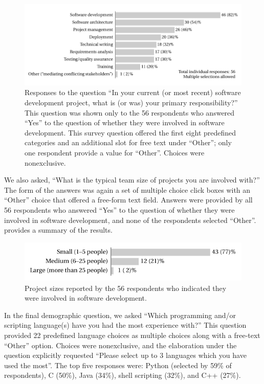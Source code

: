 \documentclass{casicswhitepaper}
\newcommand{\totaldevelopers}{56\xspace}
\begin{document}
\begin{figure}[thb]
  \vspace*{-1ex}
  \centering
  \includegraphics[width=5.9in]{files/plots/responsibilities.pdf}
  \vspace*{-4ex}
  \caption{Responses to the question  ``In your current (or most recent) software development project, what is (or was) your primary responsibility?''  This question was shown only to the 56 respondents who answered ``Yes'' to the question of whether they were involved in software development.  This survey question offered the first eight predefined categories and an additional slot for free text under ``Other''; only one respondent provide a value for ``Other''.  Choices were nonexclusive.}
  \label{responsibilities}
\end{figure}

We also asked, ``What is the typical team size of projects you are involved with?''  The form of the answers was again a set of multiple choice click boxes with an ``Other'' choice that offered a free-form text field.  Answers were provided by all \totaldevelopers respondents who answered ``Yes'' to the question of whether they were involved in software development, and none of the respondents selected ``Other''.   provides a summary of the results.

\begin{figure}[htb]
  \centering
  \includegraphics{files/plots/project-sizes.pdf}
  \vspace*{-3ex}
  \caption{Project sizes reported by the \totaldevelopers respondents who indicated they were involved in software development.}
  \label{project-sizes}
\end{figure}

In the final demographic question, we asked ``Which programming and/or scripting language(s) have you had the most experience with?''  This question provided 22 predefined language choices as multiple choices along with a free-text ``Other'' option.  Choices were nonexclusive, and the elaboration under the question explicitly requested ``Please select up to 3 languages which you have used the most''.   The top five responses were: Python (selected by 59\% of respondents), C (50\%), Java (34\%), shell scripting (32\%), and C++ (27\%).
\end{document}
